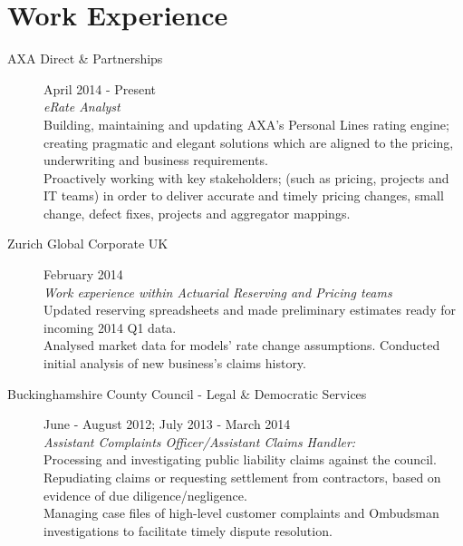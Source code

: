 \documentclass[10pt]{article}
\begin{document}
\section*{Work Experience}
\begin{description}
\item[AXA Direct \& Partnerships] April 2014 - Present\\
\emph{eRate Analyst}\\
Building, maintaining and updating AXA's Personal Lines rating engine; creating pragmatic and elegant solutions which are aligned to the pricing, underwriting and business requirements.\\
Proactively working with key stakeholders; (such as pricing, projects and IT teams) in order to deliver accurate and timely pricing changes, small change, defect fixes, projects and aggregator mappings.

\item[Zurich Global Corporate UK] February 2014\\
\emph{Work experience within Actuarial Reserving and Pricing teams}\\
Updated reserving spreadsheets and made preliminary estimates ready for incoming 2014 Q1 data.\\
Analysed market data for models' rate change assumptions. Conducted initial analysis of new business's claims history.

\item[Buckinghamshire County Council - Legal \& Democratic Services]June - August 2012; July 2013 - March 2014\\
\emph{Assistant Complaints Officer/Assistant Claims Handler:}
\\Processing and investigating public liability claims against the council. Repudiating claims or requesting settlement from contractors, based on evidence of due diligence/negligence.
\\ Managing case files of high-level customer complaints and Ombudsman investigations to facilitate timely dispute resolution.
\end{description}
\end{document}
